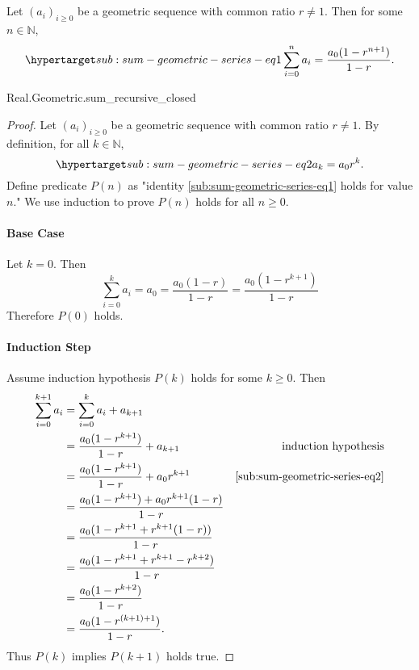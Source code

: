\documentclass{article}
\begin{document}
\subsection{}%

  Let $(a_i)_{i \geq 0}$ be a geometric sequence with common ratio $r \neq 1$.
    Then for some $n \in \mathbb{N}$,
    \begin{equation}
      \hyperlabel{sub:sum-geometric-series-eq1}
      \sum_{i=0}^n a_i = \frac{a_0(1 - r^{n+1})}{1 - r}.
    \end{equation}

    {Real.Geometric.sum\_recursive\_closed}

  \begin{proof}

    Let $(a_i)_{i \geq 0}$ be a geometric sequence with common ratio $r \neq 1$.
    By definition, for all $k \in \mathbb{N}$,
      \begin{equation}
        \hyperlabel{sub:sum-geometric-series-eq2}
        a_k = a_0r^k.
      \end{equation}
    Define predicate $P(n)$ as "identity \eqref{sub:sum-geometric-series-eq1}
      holds for value $n$."
    We use induction to prove $P(n)$ holds for all $n \geq 0$.

    \paragraph{Base Case}%

      Let $k = 0$.
      Then $$\sum_{i=0}^k a_i = a_0 = \frac{a_0(1 - r)}{1 - r} =
        \frac{a_0(1 - r^{k+1})}{1 - r}$$
      Therefore $P(0)$ holds.

    \paragraph{Induction Step}%

      Assume induction hypothesis $P(k)$ holds for some $k \geq 0$.
      Then
        \begin{align*}
          \sum_{i=0}^{k+1} a_i
            & = \sum_{i=0}^k a_i + a_{k+1} \\
            & = \frac{a_0(1 - r^{k+1})}{1 - r} + a_{k + 1}
              & \text{induction hypothesis} \\
            & = \frac{a_0(1 - r^{k+1})}{1 - r} + a_0r^{k + 1}
              & \eqref{sub:sum-geometric-series-eq2} \\
            & = \frac{a_0(1 - r^{k+1}) + a_0r^{k+1}(1 - r)}{1 - r} \\
            & = \frac{a_0(1 - r^{k+1} + r^{k+1}(1 - r))}{1 - r} \\
            & = \frac{a_0(1 - r^{k+1} + r^{k+1} - r^{k+2})}{1 - r} \\
            & = \frac{a_0(1 - r^{k+2})}{1 - r} \\
            & = \frac{a_0(1 - r^{(k + 1) + 1})}{1 - r}.
        \end{align*}
      Thus $P(k)$ implies $P(k + 1)$ holds true.


\end{proof}
\end{document}
